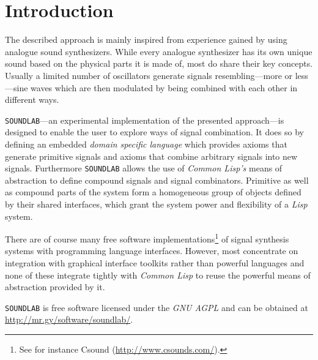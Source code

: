 \section{Introduction}

The described approach is mainly inspired from experience gained by using
analogue sound synthesizers. While every analogue synthesizer has its own
unique sound based on the physical parts it is made of, most do share
their key concepts. Usually a limited number of oscillators generate
signals resembling---more or less---sine waves which are then modulated
by being combined with each other in different ways.

\texttt{SOUNDLAB}---an experimental implementation of the presented
approach---is designed to enable the user to explore ways of signal
combination. It does so by defining an embedded \textit{domain specific
language} which provides axioms that generate primitive signals and
axioms that combine arbitrary signals into new signals. Furthermore
\texttt{SOUNDLAB} allows the use of \textit{Common Lisp's} means of
abstraction to define compound signals and signal combinators. Primitive
as well as compound parts of the system form a homogeneous group of
objects defined by their shared interfaces, which grant the system power
and flexibility of a \textit{Lisp} system.

There are of course many free software implementations\footnote{See for
instance Csound (\url{http://www.csounds.com/}).} of signal synthesis
systems with programming language interfaces. However, most concentrate
on integration with graphical interface toolkits rather than powerful
languages and none of these integrate tightly with \textit{Common Lisp}
to reuse the powerful means of abstraction provided by it.

\texttt{SOUNDLAB} is free software licensed under the \textit{GNU AGPL}
and can be obtained at \url{http://mr.gy/software/soundlab/}.
